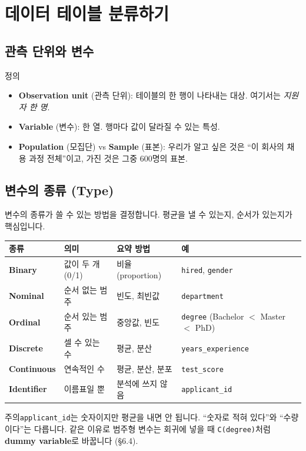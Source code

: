 \documentclass[11pt,a4paper]{article}
\newcommand{\term}[1]{\textbf{#1}}
\newcommand{\warn}{\textsf{\small 주의}\;}
\newcommand{\code}[1]{\texttt{#1}}
\begin{document}
\section{데이터 테이블 분류하기}

\subsection{관측 단위와 변수}
\begin{defbox}{정의}
\begin{itemize}
\item \term{Observation unit} (관측 단위): 테이블의 한 행이 나타내는 대상. 여기서는 \emph{지원자 한 명}.
\item \term{Variable} (변수): 한 열. 행마다 값이 달라질 수 있는 특성.
\item \term{Population} (모집단) vs \term{Sample} (표본): 우리가 알고 싶은 것은 ``이 회사의 채용 과정 전체''이고, 가진 것은 그중 600명의 표본.
\end{itemize}
\end{defbox}

\subsection{변수의 종류 (Type)}
변수의 종류가 쓸 수 있는 방법을 결정합니다. 평균을 낼 수 있는지, 순서가 있는지가 핵심입니다.

\begin{center}
\begin{tabular}{@{}l l l l@{}}
\toprule
종류 & 의미 & 요약 방법 & 예 \\
\midrule
\term{Binary} & 값이 두 개 (0/1) & 비율 (proportion) & \code{hired}, \code{gender} \\
\term{Nominal} & 순서 없는 범주 & 빈도, 최빈값 & \code{department} \\
\term{Ordinal} & 순서 있는 범주 & 중앙값, 빈도 & \code{degree} (Bachelor $<$ Master $<$ PhD) \\
\term{Discrete} & 셀 수 있는 수 & 평균, 분산 & \code{years\_experience} \\
\term{Continuous} & 연속적인 수 & 평균, 분산, 분포 & \code{test\_score} \\
\term{Identifier} & 이름표일 뿐 & 분석에 쓰지 않음 & \code{applicant\_id} \\
\bottomrule
\end{tabular}
\end{center}

\warn \code{applicant\_id}는 숫자이지만 평균을 내면 안 됩니다. ``숫자로 적혀 있다''와 ``수량이다''는 다릅니다. 같은 이유로 범주형 변수는 회귀에 넣을 때 \code{C(degree)}처럼 \term{dummy variable}로 바꿉니다 (\S6.4).
\end{document}
